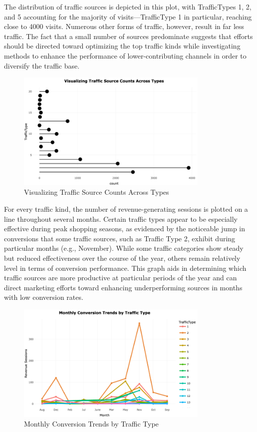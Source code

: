 \documentclass[12pt]{article}
\begin{document}
The distribution of traffic sources is depicted in this plot, with TrafficTypes 1, 2, and 5 accounting for the majority of visits—TrafficType 1 in particular, reaching close to 4000 visits. Numerous other forms of traffic, however, result in far less traffic. The fact that a small number of sources predominate suggests that efforts should be directed toward optimizing the top traffic kinds while investigating methods to enhance the performance of lower-contributing channels in order to diversify the traffic base.
\begin{figure}[h]
    \centering
    \includegraphics[width=0.82\textwidth]{Visualizing Traffic Source Counts Across Types.png}  
    \caption{Visualizing Traffic Source Counts Across Types}
\end{figure}
\vspace{0.5cm}


\FloatBarrier
For every traffic kind, the number of revenue-generating sessions is plotted on a line throughout several months. Certain traffic types appear to be especially effective during peak shopping seasons, as evidenced by the noticeable jump in conversions that some traffic sources, such as Traffic Type 2, exhibit during particular months (e.g., November). While some traffic categories show steady but reduced effectiveness over the course of the year, others remain relatively level in terms of conversion performance. This graph aids in determining which traffic sources are more productive at particular periods of the year and can direct marketing efforts toward enhancing underperforming sources in months with low conversion rates.
\begin{figure}[h]
    \centering
    \includegraphics[width=0.82\textwidth]{Monthly Conversion Trends by Traffic Type.png}  
    \caption{Monthly Conversion Trends by Traffic Type}
\end{figure}
\vspace{0.5cm}
\end{document}
